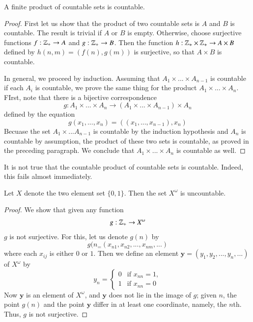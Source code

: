 \documentclass[12pt, a4paper, oneside, openright, titlepage]{book}
\begin{document}
\begin{appendices}
    \begin{theorem}
        A finite product of countable sets is countable.
    \end{theorem}
    \begin{proof}
        First let us show that the product of two countable sets is $A$ and $B$ is countable. The result is trivial if $A$ or $B$ is empty. Otherwise, choose surjective functions $f:\mathbb Z_+\rightarrow A$ and $g:\mathbb Z_+\rightarrow B$. Then the function $h:\mathbb Z_+\times \mathbb Z_+\rightarrow A\times B$ defined by $h(n,m) = (f(n),g(m))$ is surjective, so that $A\times B$ is countable.


        In general, we proceed by induction. Assuming that $A_1\times ... \times A_{n-1}$ is countable if each $A_i$ is countable, we prove the same thing for the product $A_1\times ... \times A_n$. FIrst, note that there is a bijective correspondence \begin{equation*}
            g:A_1\times ... \times A_n\rightarrow (A_1\times ... \times A_{n-1})\times A_n
        \end{equation*}
        defined by the equation \begin{equation*}
            g(x_1,...,x_n) = ((x_1,...,x_{n-1}),x_n)
        \end{equation*}
        Becuase the set $A_1\times ... A_{n-1}$ is countable by the induction hypothesis and $A_n$ is countable by assumption, the product of these two sets is countable, as proved in the preceding paragraph. We conclude that $A_1\times ... \times A_n$ is countable as well.
    \end{proof}

    It is not true that the countable product of countable sets is countable. Indeed, this fails almost immediately.

    \begin{theorem}
        Let $X$ denote the two element set $\{0,1\}$. Then the set $X^{\omega}$ is uncountable.
    \end{theorem}
    \begin{proof}
        We show that given any function $$g:\mathbb Z_+\rightarrow X^{\omega}$$ $g$ is not surjective. For this, let us denote $g(n)$ by \begin{equation*}
            g(n_ = (x_{n1},x_{n2},...,x_{nm},...)
        \end{equation*}
        where each $x_{ij}$ is either $0$ or $1$. Then we define an element $\mathbf{y} = (y_1,y_2,...,y_n,...)$ of $X^{\omega}$ by \begin{equation*}
            y_n = \left\{\begin{array}{ll} 0 & \text{if } x_{nn} = 1,\\ 1 & \text{if } x_{nn} = 0\end{array}\right.
        \end{equation*}
        Now $\mathbf{y}$ is an element of $X^{\omega}$, and $\mathbf{y}$ does not lie in the image of $g$; given $n$, the point $g(n)$ and the point $\mathbf{y}$ differ in at least one coordinate, namely, the $n$th. Thus, $g$ is not surjective.
    \end{proof}



\end{appendices}
\end{document}
